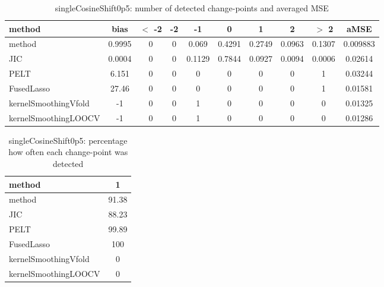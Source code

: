 \begin{table}[ht]
\centering
\begin{tabular}{l|c|ccccccc|c}
  \hline
method & bias & $<$ -2 & -2 & -1 & 0 & 1 & 2 & $>$ 2 & aMSE \\ 
  \hline
method & 0.9995 &     0 &     0 & 0.069 & 0.4291 & 0.2749 & 0.0963 & 0.1307 & 0.009883 \\ 
  JIC & 0.0004 &     0 &     0 & 0.1129 & 0.7844 & 0.0927 & 0.0094 & 0.0006 & 0.02614 \\ 
  PELT & 6.151 &     0 &     0 &     0 &     0 &     0 &     0 &     1 & 0.03244 \\ 
  FusedLasso & 27.46 &     0 &     0 &     0 &     0 &     0 &     0 &     1 & 0.01581 \\ 
  kernelSmoothingVfold &    -1 &     0 &     0 &     1 &     0 &     0 &     0 &     0 & 0.01325 \\ 
  kernelSmoothingLOOCV &    -1 &     0 &     0 &     1 &     0 &     0 &     0 &     0 & 0.01286 \\ 
   \hline
\end{tabular}
\caption{singleCosineShift0p5: number of detected change-points and averaged MSE} 
\label{tab:singleCosineShift0p5Njumps}
\end{table}
\begin{table}[ht]
\centering
\begin{tabular}{l|c}
  \hline
method & 1 \\ 
  \hline
method &  91.38 \\ 
  JIC &  88.23 \\ 
  PELT &  99.89 \\ 
  FusedLasso &    100 \\ 
  kernelSmoothingVfold &      0 \\ 
  kernelSmoothingLOOCV &      0 \\ 
   \hline
\end{tabular}
\caption{singleCosineShift0p5: percentage how often each change-point was detected} 
\label{tab:singleCosineShift0p5Detections}
\end{table}
